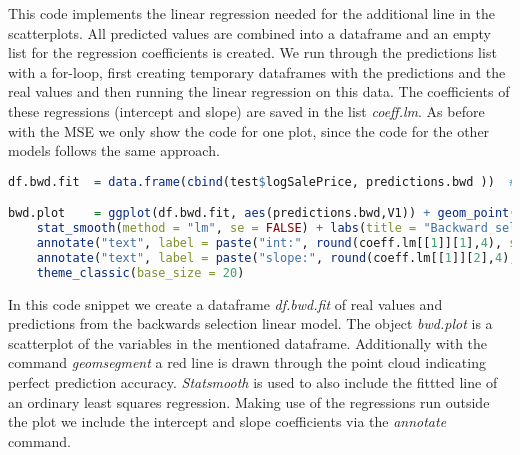 This code implements the linear regression needed for the additional line in the scatterplots. All predicted values are combined into a dataframe and an empty list for the regression coefficients is created. We run through the predictions list with a for-loop, first creating temporary dataframes with the predictions and the real values and then running the linear regression on this data. The coefficients of these  regressions (intercept and slope) are saved in the list \textit{coeff.lm}. As before with the MSE we only show the code for one plot, since  the code for the other models follows the same approach.
\begin{lstlisting}[language=R]
df.bwd.fit  = data.frame(cbind(test$logSalePrice, predictions.bwd ))  # creating dataframe containing real and predicted outcome

bwd.plot    = ggplot(df.bwd.fit, aes(predictions.bwd,V1)) + geom_point() + geom_segment(x = -4, y = -4, xend = 4, yend = 4, color = "red", size = 1.3) +
    stat_smooth(method = "lm", se = FALSE) + labs(title = "Backward selection linear model", x = "bwd.fit predictions", y = "logSalePrice") +
    annotate("text", label = paste("int:", round(coeff.lm[[1]][1],4), sep = " "), x = -2, y = 3, size =10, color = "blue") +
    annotate("text", label = paste("slope:", round(coeff.lm[[1]][2],4), sep = " "), x = -2, y = 2.5, size =10, color = "blue") + 
    theme_classic(base_size = 20) 
\end{lstlisting} 
In this code snippet we create a dataframe \textit{df.bwd.fit} of real values and predictions from the backwards selection linear model. The object \textit{bwd.plot} is a scatterplot of the variables in the mentioned dataframe. Additionally with the command \textit{geomsegment} a red line is drawn through the point cloud indicating perfect prediction accuracy. \textit{Statsmooth} is used to also include the fittted line of an ordinary least squares regression. Making use of the regressions run outside the plot we include the intercept and slope coefficients via the \textit{annotate} command.   